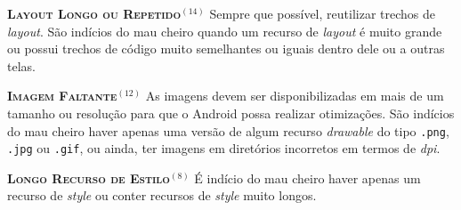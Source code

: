   \noindent
  \textbf{\textsc{{\small Layout Longo ou Repetido}}}$^{(14)}$
      Sempre que possível, reutilizar trechos de \textit{layout}. São indícios do mau cheiro quando um recurso de \textit{layout} é muito grande ou possui trechos de código muito semelhantes ou iguais dentro dele ou a outras telas.


  \noindent
  \textbf{\textsc{{\small Imagem Faltante}}}$^{(12)}$
      As imagens devem ser disponibilizadas em mais de um tamanho ou resolução para que o Android possa realizar otimizações. São indícios do mau cheiro haver apenas uma versão de algum recurso \textit{drawable} do tipo \texttt{.png}, \texttt{.jpg} ou \texttt{.gif}, ou ainda, ter imagens em diretórios incorretos em termos de \textit{dpi}.


  \noindent
  \textbf{\textsc{{\small Longo Recurso de Estilo}}}$^{(8)}$
      É indício do mau cheiro haver apenas um recurso de \textit{style} ou conter recursos de \textit{style} muito longos.


